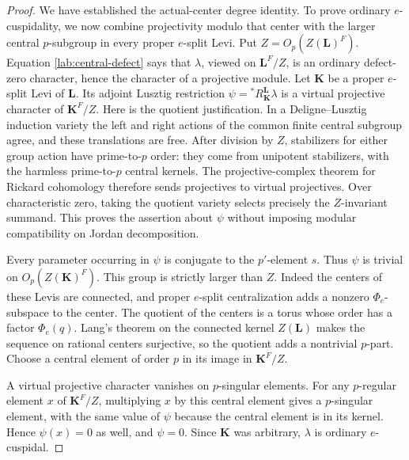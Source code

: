 \begin{proof}
We have established the actual-center degree identity.
To prove ordinary $e$-cuspidality, we now combine projectivity
modulo that center with the larger central $p$-subgroup in every
proper $e$-split Levi.
Put $Z=O_p(Z(\mathbf L)^F)$.  Equation
\eqref{lab:central-defect} says that $\lambda$, viewed on
$\mathbf L^F/Z$, is an ordinary defect-zero character,
hence the character of a projective module.  Let
$\mathbf K$ be a proper $e$-split Levi of $\mathbf L$.
Its adjoint Lusztig restriction
$\psi={}^*R^{\mathbf L}_{\mathbf K}\lambda$ is a virtual
projective character of $\mathbf K^F/Z$.
Here is the quotient justification.  In a Deligne--Lusztig
induction variety the left and right actions of the common
finite central subgroup agree, and these translations are
free.  After division by $Z$, stabilizers for either group
action have prime-to-$p$ order: they come from unipotent
stabilizers, with the harmless prime-to-$p$ central kernels.
The projective-complex theorem for Rickard cohomology
\cite{RickardEtale} therefore sends projectives to virtual
projectives.  Over characteristic zero, taking the quotient
variety selects precisely the $Z$-invariant summand.  This
proves the assertion about $\psi$ without imposing modular
compatibility on Jordan decomposition.

Every parameter occurring in $\psi$ is conjugate to the
$p'$-element $s$.  Thus $\psi$ is trivial on
$O_p(Z(\mathbf K)^F)$.  This group is strictly larger than
$Z$.  Indeed the centers of these Levis are connected, and
proper $e$-split centralization adds a nonzero
$\Phi_e$-subspace to the center.  The quotient of the
centers is a torus whose order has a factor
$\Phi_e(q)$.  Lang's theorem on the connected kernel
$Z(\mathbf L)$ makes the sequence on rational centers
surjective, so the quotient adds a nontrivial $p$-part.
Choose a central element of order $p$ in its
image in $\mathbf K^F/Z$.

A virtual projective character vanishes on $p$-singular
elements.  For any $p$-regular element $x$ of
$\mathbf K^F/Z$, multiplying $x$ by this central element
gives a $p$-singular element, with the same value of $\psi$
because the central element is in its kernel.  Hence
$\psi(x)=0$ as well, and $\psi=0$.  Since $\mathbf K$
was arbitrary, $\lambda$ is ordinary $e$-cuspidal.
\end{proof}

